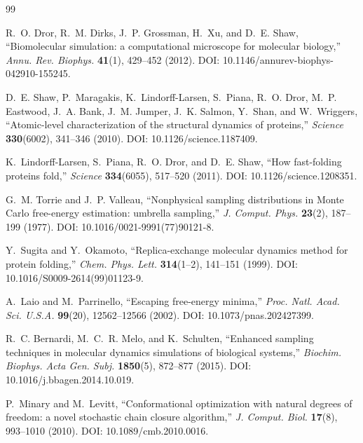 \begin{thebibliography}{99}
\small
\setlength{\itemsep}{1pt}

R.~O. Dror, R.~M. Dirks, J.~P. Grossman, H.~Xu, and D.~E. Shaw,
``Biomolecular simulation: a computational microscope for molecular biology,''
\emph{Annu. Rev. Biophys.} \textbf{41}(1), 429--452 (2012).
DOI: 10.1146/annurev-biophys-042910-155245.

D.~E. Shaw, P.~Maragakis, K.~Lindorff-Larsen, S.~Piana, R.~O. Dror,
M.~P. Eastwood, J.~A. Bank, J.~M. Jumper, J.~K. Salmon, Y.~Shan, and
W.~Wriggers,
``Atomic-level characterization of the structural dynamics of proteins,''
\emph{Science} \textbf{330}(6002), 341--346 (2010).
DOI: 10.1126/science.1187409.

K.~Lindorff-Larsen, S.~Piana, R.~O. Dror, and D.~E. Shaw,
``How fast-folding proteins fold,''
\emph{Science} \textbf{334}(6055), 517--520 (2011).
DOI: 10.1126/science.1208351.

G.~M. Torrie and J.~P. Valleau,
``Nonphysical sampling distributions in Monte Carlo free-energy estimation:
umbrella sampling,''
\emph{J. Comput. Phys.} \textbf{23}(2), 187--199 (1977).
DOI: 10.1016/0021-9991(77)90121-8.

Y.~Sugita and Y.~Okamoto,
``Replica-exchange molecular dynamics method for protein folding,''
\emph{Chem. Phys. Lett.} \textbf{314}(1--2), 141--151 (1999).
DOI: 10.1016/S0009-2614(99)01123-9.

A.~Laio and M.~Parrinello,
``Escaping free-energy minima,''
\emph{Proc. Natl. Acad. Sci. U.S.A.} \textbf{99}(20), 12562--12566 (2002).
DOI: 10.1073/pnas.202427399.

R.~C. Bernardi, M.~C.~R. Melo, and K.~Schulten,
``Enhanced sampling techniques in molecular dynamics simulations of biological
systems,''
\emph{Biochim. Biophys. Acta Gen. Subj.} \textbf{1850}(5), 872--877 (2015).
DOI: 10.1016/j.bbagen.2014.10.019.

P.~Minary and M.~Levitt,
``Conformational optimization with natural degrees of freedom: a novel
stochastic chain closure algorithm,''
\emph{J. Comput. Biol.} \textbf{17}(8), 993--1010 (2010).
DOI: 10.1089/cmb.2010.0016.


\end{thebibliography}
